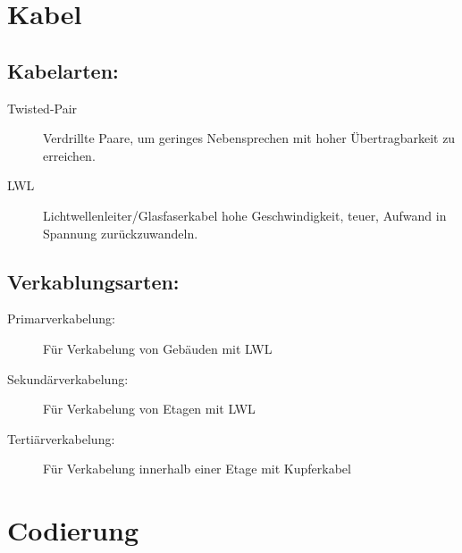 \documentclass[12pt,a4paper]{article}
\begin{document}
	\section{Kabel}

		\subsection{Kabelarten:}
		\begin{description}
			\item[Twisted-Pair] Verdrillte Paare, um geringes Nebensprechen mit hoher Übertragbarkeit zu erreichen.
			\item[LWL] Lichtwellenleiter/Glasfaserkabel hohe Geschwindigkeit, teuer, Aufwand in Spannung zurückzuwandeln.
		\end{description}

		\subsection{Verkablungsarten:}
		\begin{description}
			\item[Primarverkabelung: ] Für Verkabelung von Gebäuden mit LWL
			\item[Sekundärverkabelung: ] Für Verkabelung von Etagen mit LWL
			\item[Tertiärverkabelung: ] Für Verkabelung innerhalb einer Etage mit Kupferkabel
		\end{description}

	\section{Codierung}
\end{document}
